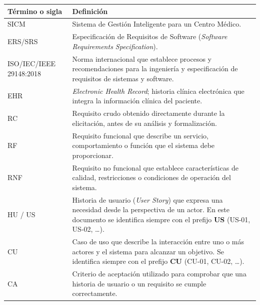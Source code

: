 \documentclass[11pt,a4paper]{article}
\begin{document}
	
	\begin{longtable}{p{} p{}}
		
		
		
		\toprule
		\textbf{Término o sigla} & \textbf{Definición} \\
		\midrule
		\endhead
		
		\bottomrule
		\endlastfoot
		
		SICM &
		Sistema de Gestión Inteligente para un Centro Médico. \\
		
		ERS/SRS &
		Especificación de Requisitos de Software (\textit{Software Requirements Specification}). \\
		
		ISO/IEC/IEEE 29148:2018 &
		Norma internacional que establece procesos y recomendaciones para la ingeniería y especificación de requisitos de sistemas y software. \\
		
		EHR &
		\textit{Electronic Health Record}; historia clínica electrónica que integra la información clínica del paciente. \\
		
		RC &
		Requisito crudo obtenido directamente durante la elicitación, antes de su análisis y formalización. \\
		
		RF &
		Requisito funcional que describe un servicio, comportamiento o función que el sistema debe proporcionar. \\
		
		RNF &
		Requisito no funcional que establece características de calidad, restricciones o condiciones de operación del sistema. \\
		
		HU / US &
		Historia de usuario (\textit{User Story}) que expresa una necesidad desde la perspectiva de un actor. En este documento se identifica siempre con el prefijo \textbf{US} (US-01, US-02, \ldots). \\
		
		CU &
		Caso de uso que describe la interacción entre uno o más actores y el sistema para alcanzar un objetivo. Se identifica siempre con el prefijo \textbf{CU} (CU-01, CU-02, \ldots). \\
		
		CA &
		Criterio de aceptación utilizado para comprobar que una historia de usuario o un requisito se cumple correctamente. \\
		

\end{longtable}
\end{document}
